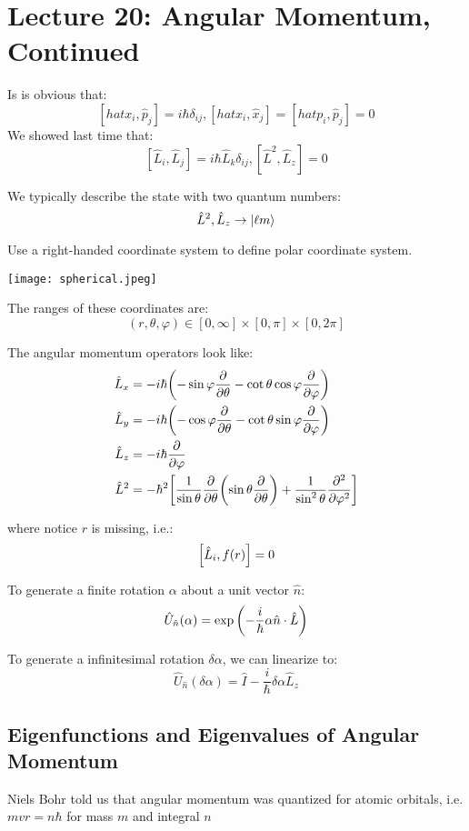 \section{Lecture 20: Angular Momentum, Continued}

Is is obvious that:
\[ [hat{x}_i, \hat{p}_j] = i \hbar \delta_{ij}, [hat{x}_i, \hat{x}_j] = [hat{p}_i, \hat{p}_j] = 0 \]
We showed last time that:
\[ [\hat{L}_i, \hat{L}_j] = i \hbar \hat{L}_k \delta_{ij}, [\hat{L}^2, \hat{L}_z] = 0 \]

We typically describe the state with two quantum numbers:
\[ \hat{L}^2, \hat{L}_z \to \ket{\ell m}  \]

Use a right-handed coordinate system to define polar coordinate system.

\texttt{[image: spherical.jpeg]}

The ranges of these coordinates are:
\[ (r, \theta, \varphi) \in [0, \infty] \times [0, \pi] \times [0, 2\pi]\]

The angular momentum operators look like:
\begin{align*}
    \hat{L}_x &= -i\hbar\qty(- \sin \varphi \pdv{}{\theta} - \cot \theta \cos \varphi \pdv{}{\varphi}) \\
    \hat{L}_y &= -i\hbar\qty(- \cos \varphi \pdv{}{\theta} - \cot \theta \sin \varphi \pdv{}{\varphi}) \\
    \hat{L}_z &= -i\hbar \pdv{}{\varphi} \\
    \hat{L}^2 &= -\hbar^2\qty[\frac{1}{\sin \theta} \pdv{}{\theta} \qty(\sin \theta \pdv{}{\theta}) + \frac{1}{\sin^2\theta} \pdv{^2}{\varphi^2}]
\end{align*}

where notice $r$ is missing, i.e.:
\[ \comm{\hat{L}_i}{f(r)} = 0 \]

\begin{theorem}
    To generate a finite rotation $\alpha$ about a unit vector $\hat{n}$:
    \[ \hat{U}_{\hat{n}}(\alpha) = \exp\qty(- \frac{i}{\hbar} \alpha \hat{n} \cdot \hat{L})\]

    To generate a infinitesimal rotation $\delta \alpha$, we can linearize to:
    \[ \hat{U}_{\hat{n}}(\delta\alpha) = \hat{I} - \frac{i}{\hbar} \delta\alpha \hat{L}_z\]
\end{theorem}

\subsection{Eigenfunctions and Eigenvalues of Angular Momentum}
Niels Bohr told us that angular momentum was quantized for atomic orbitals, i.e. $mvr = n \hbar$ for mass $m$ and integral $n$

